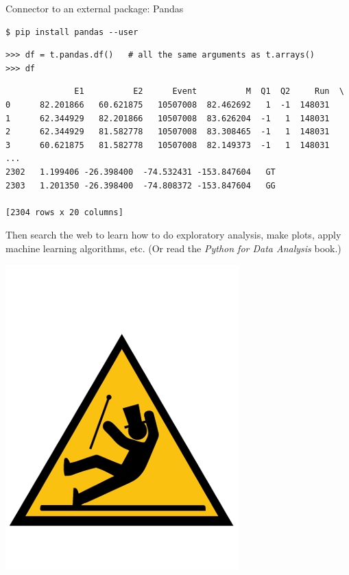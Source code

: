\documentclass[aspectratio=169]{beamer}
\begin{document}


\begin{frame}[fragile]{Connector to an external package: Pandas}
\vspace{0.25 cm}
\small
\begin{verbatim}
$ pip install pandas --user
\end{verbatim}
\begin{verbatim}
>>> df = t.pandas.df()   # all the same arguments as t.arrays()
>>> df
\end{verbatim}
\begin{verbatim}
              E1          E2      Event          M  Q1  Q2     Run  \
0      82.201866   60.621875   10507008  82.462692   1  -1  148031
1      62.344929   82.201866   10507008  83.626204  -1   1  148031
2      62.344929   81.582778   10507008  83.308465  -1   1  148031
3      60.621875   81.582778   10507008  82.149373  -1   1  148031
...
2302   1.199406 -26.398400  -74.532431 -153.847604   GT
2303   1.201350 -26.398400  -74.808372 -153.847604   GG

[2304 rows x 20 columns]
\end{verbatim}

\vspace{0.25 cm}
Then search the web to learn how to do exploratory analysis, make plots, apply machine learning algorithms, etc. (Or read the {\it Python for Data Analysis} book.)

\vspace{-3 cm}
\hfill \includegraphics[width=1.5 cm]{caution.png}\hspace{-0.9 cm}
\vspace{3 cm}
\end{frame}
\end{document}
